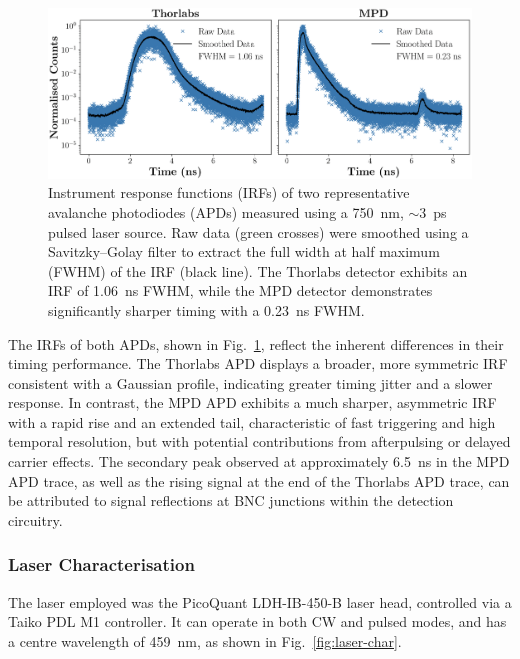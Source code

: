 \begin{figure}[h]
    \centering
    \includegraphics[width=0.9\linewidth]{Figures/APDChar.png}
    \caption{Instrument response functions (IRFs) of two representative avalanche photodiodes (APDs) measured using a 750~nm, $\sim$3~ps pulsed laser source. Raw data (green crosses) were smoothed using a Savitzky–Golay filter to extract the full width at half maximum (FWHM) of the IRF (black line). The Thorlabs detector exhibits an IRF of 1.06~ns FWHM, while the MPD detector demonstrates significantly sharper timing with a 0.23~ns FWHM.}
    \label{fig:apd-characterisation}
\end{figure}

The IRFs of both APDs, shown in Fig.~\ref{fig:apd-characterisation}, reflect the inherent differences in their timing performance. The Thorlabs APD displays a broader, more symmetric IRF consistent with a Gaussian profile, indicating greater timing jitter and a slower response. In contrast, the MPD APD exhibits a much sharper, asymmetric IRF with a rapid rise and an extended tail, characteristic of fast triggering and high temporal resolution, but with potential contributions from afterpulsing or delayed carrier effects. The secondary peak observed at approximately 6.5~ns in the MPD APD trace, as well as the rising signal at the end of the Thorlabs APD trace, can be attributed to signal reflections at BNC junctions within the detection circuitry.


\subsubsection{Laser Characterisation}

The laser employed was the PicoQuant LDH-IB-450-B laser head, controlled via a Taiko PDL M1 controller. It can operate in both CW and pulsed modes, and has a centre wavelength of 459~nm, as shown in Fig.~\ref{fig:laser-char}.

